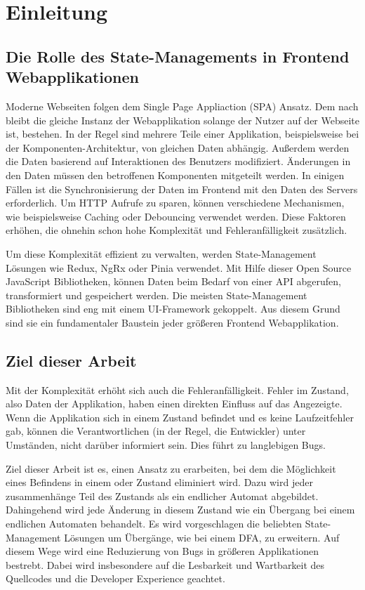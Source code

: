 \chapter{Einleitung}

\section{Die Rolle des State-Managements in Frontend Webapplikationen}

Moderne Webseiten folgen dem Single Page Appliaction (SPA) Ansatz. Dem nach bleibt die gleiche Instanz der Webapplikation solange der Nutzer auf der Webseite ist, bestehen. In der Regel sind mehrere Teile einer Applikation, beispielsweise bei der Komponenten-Architektur, von gleichen Daten abhängig. Außerdem werden die Daten basierend auf Interaktionen des Benutzers modifiziert. Änderungen in den Daten müssen den betroffenen Komponenten mitgeteilt werden. In einigen Fällen ist die Synchronisierung der Daten im Frontend mit den Daten des Servers erforderlich. Um HTTP Aufrufe zu sparen, können verschiedene Mechanismen, wie beispielsweise Caching oder Debouncing verwendet werden. Diese Faktoren erhöhen, die ohnehin schon hohe Komplexität und Fehleranfälligkeit zusätzlich.

Um diese Komplexität effizient zu verwalten, werden State-Management Lösungen wie Redux, NgRx oder Pinia verwendet. Mit Hilfe dieser Open Source JavaScript Bibliotheken, können Daten beim Bedarf von einer API abgerufen, transformiert und gespeichert werden. Die meisten State-Management Bibliotheken sind eng mit einem UI-Framework gekoppelt. Aus diesem Grund sind sie ein fundamentaler Baustein jeder größeren Frontend Webapplikation.

\section{Ziel dieser Arbeit}

Mit der Komplexität erhöht sich auch die Fehleranfälligkeit. Fehler im Zustand, also Daten der Applikation, haben einen direkten Einfluss auf das Angezeigte. Wenn die Applikation sich in einem  Zustand befindet und es keine Laufzeitfehler gab, können die Verantwortlichen (in der Regel, die Entwickler) unter Umständen, nicht darüber informiert sein. Dies führt zu langlebigen Bugs.

Ziel dieser Arbeit ist es, einen Ansatz zu erarbeiten, bei dem die Möglichkeit eines Befindens in einem  oder  Zustand eliminiert wird. Dazu wird jeder zusammenhänge Teil des Zustands als ein endlicher Automat abgebildet. Dahingehend wird jede Änderung in diesem Zustand wie ein Übergang bei einem endlichen Automaten behandelt. Es wird vorgeschlagen die beliebten State-Management Lösungen um  Übergänge, wie bei einem DFA, zu erweitern. Auf diesem Wege wird eine Reduzierung von Bugs in größeren Applikationen bestrebt. Dabei wird insbesondere auf die Lesbarkeit und Wartbarkeit des Quellcodes und die Developer Experience geachtet.